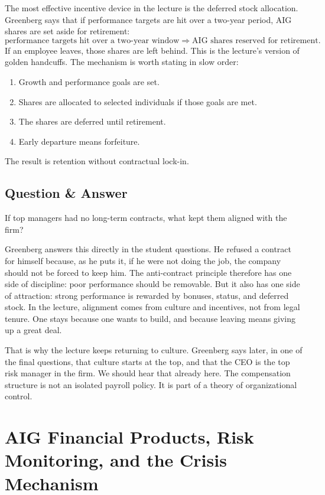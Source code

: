 The most effective incentive device in the lecture is the deferred stock allocation. Greenberg says that if performance targets are hit over a two-year period, AIG shares are set aside for retirement:
\begin{equation}
\text{performance targets hit over a two-year window}
\Rightarrow
\text{AIG shares reserved for retirement}.
\end{equation}
If an employee leaves, those shares are left behind. This is the lecture's version of golden handcuffs. The mechanism is worth stating in slow order:
\begin{enumerate}
\item Growth and performance goals are set.
\item Shares are allocated to selected individuals if those goals are met.
\item The shares are deferred until retirement.
\item Early departure means forfeiture.
\end{enumerate}
The result is retention without contractual lock-in.

\subsection{Question \& Answer}

If top managers had no long-term contracts, what kept them aligned with the firm?

Greenberg answers this directly in the student questions. He refused a contract for himself because, as he puts it, if he were not doing the job, the company should not be forced to keep him. The anti-contract principle therefore has one side of discipline: poor performance should be removable. But it also has one side of attraction: strong performance is rewarded by bonuses, status, and deferred stock. In the lecture, alignment comes from culture and incentives, not from legal tenure. One stays because one wants to build, and because leaving means giving up a great deal.

That is why the lecture keeps returning to culture. Greenberg says later, in one of the final questions, that culture starts at the top, and that the CEO is the top risk manager in the firm. We should hear that already here. The compensation structure is not an isolated payroll policy. It is part of a theory of organizational control.

\section{AIG Financial Products, Risk Monitoring, and the Crisis Mechanism}


